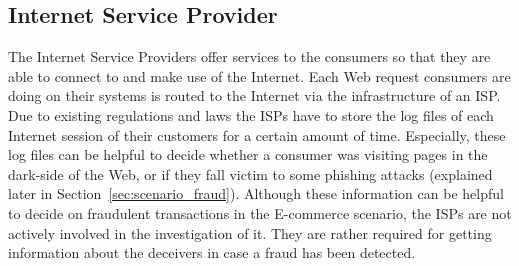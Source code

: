 
\subsection{Internet Service Provider}
\label{subsec:stakeholder_isp}

The Internet Service Providers offer services to the consumers so that they are able to connect to and make use of the Internet. Each Web request consumers are doing on their systems is routed to the Internet via the infrastructure of an \gls{ISP}. Due to existing regulations and laws the \gls{ISP}s have to store the log files of each Internet session of their customers for a certain amount of time. Especially, these log files can be helpful to decide whether a consumer was visiting pages in the dark-side of the Web, or if they fall victim to some phishing attacks (explained later in Section~\ref{sec:scenario_fraud}). Although these information can be helpful to decide on fraudulent transactions in the \gls{E-commerce} scenario, the \gls{ISP}s are not actively involved in the investigation of it. They are rather required for getting information about the deceivers in case a fraud has been detected.


